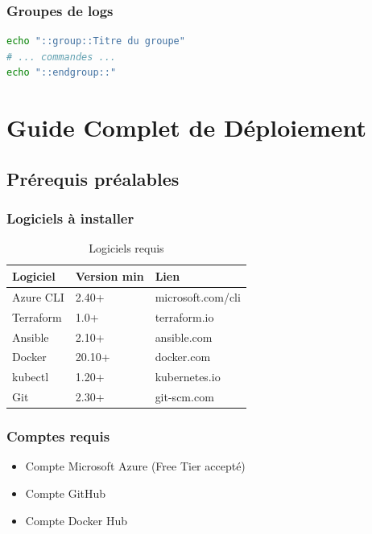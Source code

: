 \documentclass[12pt,a4paper,twoside]{report}
\begin{document}
\subsection{Groupes de logs}

\begin{lstlisting}[language=bash]
echo "::group::Titre du groupe"
# ... commandes ...
echo "::endgroup::"
\end{lstlisting}

\newpage

\chapter{Guide Complet de Déploiement}

\section{Prérequis préalables}

\subsection{Logiciels à installer}

\begin{table}[H]
    \centering
    \caption{Logiciels requis}
    \begin{tabular}{|l|l|l|}
        \hline
        \textbf{Logiciel} & \textbf{Version min} & \textbf{Lien} \\
        \hline
        Azure CLI & 2.40+ & microsoft.com/cli \\
        Terraform & 1.0+ & terraform.io \\
        Ansible & 2.10+ & ansible.com \\
        Docker & 20.10+ & docker.com \\
        kubectl & 1.20+ & kubernetes.io \\
        Git & 2.30+ & git-scm.com \\
        \hline
    \end{tabular}
\end{table}

\subsection{Comptes requis}

\begin{itemize}
    \item Compte Microsoft Azure (Free Tier accepté)
    \item Compte GitHub
    \item Compte Docker Hub
\end{itemize}
\end{document}
